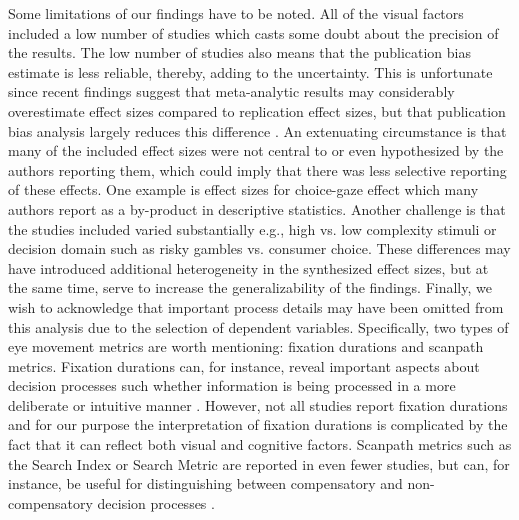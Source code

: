 Some limitations of our findings have to be noted. All of the visual factors included a low number of studies which casts some doubt about the precision of the results. The low number of studies also means that the publication bias estimate is less reliable, thereby, adding to the uncertainty. This is unfortunate since recent findings suggest that meta-analytic results may considerably overestimate effect sizes compared to replication effect sizes, but that publication bias analysis largely reduces this difference \citep{kvarven2020}. An extenuating circumstance is that many of the included effect sizes were not central to or even hypothesized by the authors reporting them, which could imply that there was less selective reporting of these effects. One example is effect sizes for choice-gaze effect which many authors report as a by-product in descriptive statistics. Another challenge is that the studies included varied substantially e.g., high vs. low complexity stimuli or decision domain such as risky gambles vs. consumer choice. These differences may have introduced additional heterogeneity in the synthesized effect sizes, but at the same time, serve to increase the generalizability of the findings. Finally, we wish to acknowledge that important process details may have been omitted from this analysis due to the selection of dependent variables. Specifically, two types of eye movement metrics are worth mentioning: fixation durations and scanpath metrics. Fixation durations can, for instance, reveal important aspects about decision processes such whether information is being processed in a more deliberate or intuitive manner \citep{horstmann2009}. However, not all studies report fixation durations and for our purpose the interpretation of fixation durations is complicated by the fact that it can reflect both visual and cognitive factors. Scanpath metrics such as the Search Index or Search Metric \citep{payne1976} are reported in even fewer studies, but can, for instance, be useful for distinguishing between compensatory and non-compensatory decision processes \citep{schoemann2019}. \\ 

